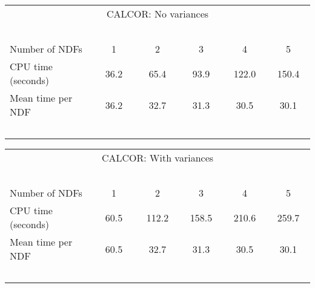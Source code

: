 \begin{center}
   \begin{tabular}{|l||c|c|c|c|c|}
   \multicolumn{6}{c}{CALCOR: No variances} \\
   \multicolumn{6}{l}{~~~}
   \\ \hline
   Number of NDFs    & ~~~1~~~ & ~~~2~~~ & ~~~3~~~ & ~~~4~~~ & ~~~5~~~
    \\ \hline
   CPU time (seconds)&  36.2   & 65.4    & 93.9    & 122.0   & 150.4
    \\ \hline
   Mean time per NDF &  36.2   & 32.7    & 31.3    & 30.5     & 30.1
    \\ \hline
   \multicolumn{6}{l}{~~~}
   \\
   \end{tabular}
   \begin{tabular}{|l||c|c|c|c|c|}
   \multicolumn{6}{c}{CALCOR: With variances} \\
   \multicolumn{6}{l}{~~~}
   \\ \hline
   Number of NDFs    & ~~~1~~~ & ~~~2~~~ & ~~~3~~~ & ~~~4~~~ & ~~~5~~~
    \\ \hline
   CPU time (seconds)&  60.5   & 112.2   & 158.5   & 210.6   & 259.7
    \\ \hline
   Mean time per NDF &  60.5   & 32.7    & 31.3    & 30.5    & 30.1
    \\ \hline
   \multicolumn{6}{l}{~~~}
   \\
   \end{tabular}
\end{center}

